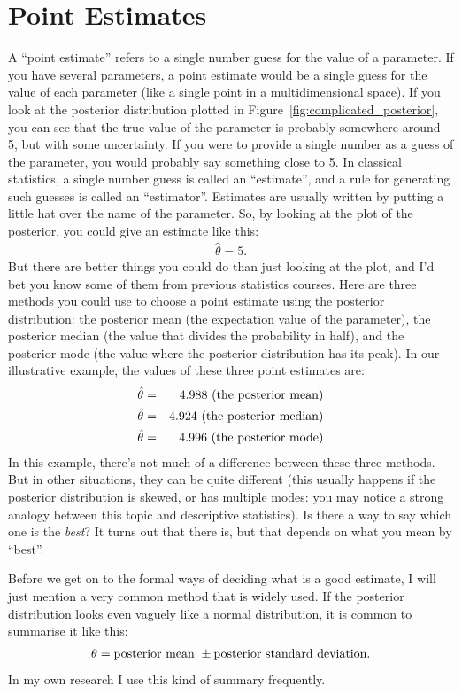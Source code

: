 \section{Point Estimates}
A ``point estimate'' refers to a single number guess for the value of a parameter.
If you have several parameters, a point estimate would be a single guess for the
value of each parameter (like a single point in a multidimensional space).
If you look at the
posterior distribution plotted in Figure~\ref{fig:complicated_posterior}, you
can see that the true value of the parameter is probably somewhere around 5,
but with some uncertainty. If you were to provide a single number as a guess of
the parameter, you would probably say something close to 5. In classical statistics, a
single number guess is called an ``estimate'', and a rule for generating such
guesses is called an ``estimator''. Estimates are usually written by putting a
little hat over the name of the parameter. So, by looking at the plot of the
posterior, you could give an estimate like this:
\begin{eqnarray}
\hat{\theta} = 5.
\end{eqnarray}
But there are better things you could do than just looking at the plot, and I'd bet you know some of them
from previous statistics courses. Here are three methods you could use to
choose a point estimate using the posterior distribution: the posterior mean
(the expectation value of the parameter), the posterior median
(the value that divides the probability
in half), and the posterior mode (the value where the posterior distribution has its
peak). In our illustrative example, the values of these three point estimates
are:
\begin{eqnarray}
\hat{\theta} &=& 4.988 \textnormal{ (the posterior mean)}\\
\hat{\theta} &=& 4.924 \textnormal{ (the posterior median)}\\
\hat{\theta} &=& 4.996 \textnormal{ (the posterior mode)}
\end{eqnarray}
In this example, there's not much of a difference between these three methods.
But in other situations, they can be quite different (this usually happens if
the posterior distribution is skewed, or has multiple modes: you may notice a
strong analogy between this topic and descriptive statistics). Is there a way
to say which one is the {\it best}? It turns out that there is, but that
depends on what you mean by ``best''.

Before we get on to the formal ways of deciding what is a good estimate, I will
just mention a very common method that is widely used. If the posterior distribution
looks even vaguely like a normal distribution, it is common to summarise it like
this:
\begin{eqnarray}
\theta = \textnormal{posterior mean }\pm\textnormal{posterior standard deviation}.
\end{eqnarray}
In my own research I use this kind of summary frequently.

